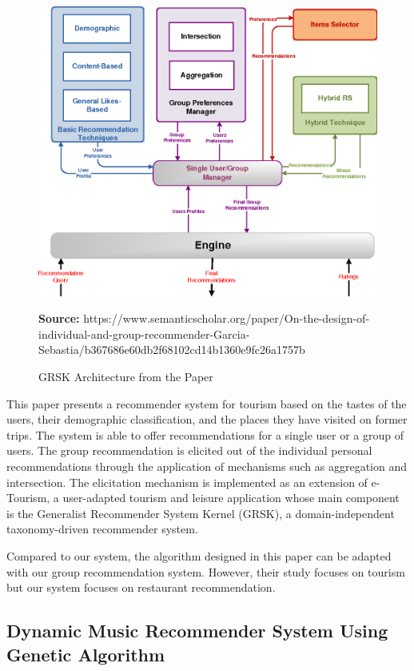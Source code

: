 \documentclass[12pt,oneside,openright,a4paper]{cpe-english-project}
\newcommand*{\captionsource}[2]{%
  \caption[{#1}]{#1}\vspace{-8pt}
  \textbf{Source:} #2}
\begin{document}
\begin{figure}[H]\centering
\includegraphics[width=400pt]{./images/2grsk.png}
\label{fig:2grsk}
\captionsource{GRSK Architecture from the Paper}{https://www.semanticscholar.org/paper/On-the-design-of-individual-and-group-recommender-Garcia-Sebastia/b367686e60db2f68102cd14b1360e9fc26a1757b}
\end{figure}\vspace{-24pt}
\vspace{1em}

This paper presents a recommender system for tourism based on the tastes of the users, their demographic classification, and the places they have visited on former trips. The system is able to offer recommendations for a single user or a group of users. The group recommendation is elicited out of the individual personal recommendations through the application of mechanisms such as aggregation and intersection. The elicitation mechanism is implemented as an extension of e-Tourism, a user-adapted tourism and leisure application whose main component is the Generalist Recommender System Kernel (GRSK), a domain-independent taxonomy-driven recommender system. \cite{ExpertSystemsWithApplications}

Compared to our system, the algorithm designed in this paper can be adapted with our group recommendation system. However, their study focuses on tourism but our system focuses on restaurant recommendation.

\newpage
\subsection{Dynamic Music Recommender System Using Genetic Algorithm}
\end{document}
